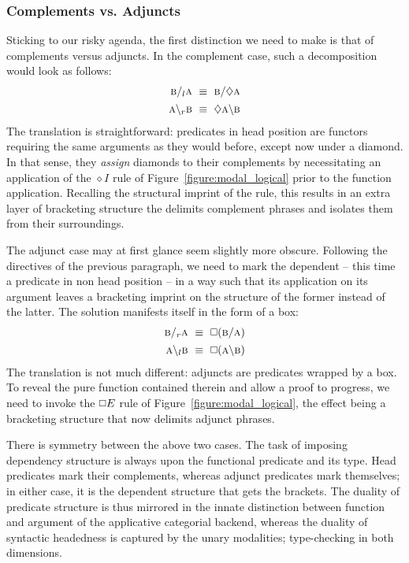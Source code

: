 \subsubsection{Complements vs. Adjuncts}
Sticking to our risky agenda, the first distinction we need to make is that of complements versus adjuncts.
In the complement case, such a decomposition would look as follows:
\begin{align}
	\prop{b} \divright_l \prop{a} \ \equiv \ \prop{b} \divright \diamond \prop{a} \\
	\prop{a} \divleft_r \prop{b} \ \equiv \ \diamond  \prop{a} \divleft \prop{b}
\end{align}
The translation is straightforward: predicates in head position are functors requiring the same arguments as they would before, except now under a diamond.
In that sense, they \textit{assign} diamonds to their complements by necessitating an application of the $\diamond I$ rule of Figure~\ref{figure:modal_logical} prior to the function application.
Recalling the structural imprint of the rule, this results in an extra layer of bracketing structure the delimits complement phrases and isolates them from their surroundings.

The adjunct case may at first glance seem slightly more obscure.
Following the directives of the previous paragraph, we need to mark the dependent -- this time a predicate in non head position -- in a way such that its application on its argument leaves a bracketing imprint on the structure of the former instead of the latter.
The solution manifests itself in the form of a box:
\begin{align}
	\prop{b} \divright_r \prop{a} \ \equiv \ \bx (\prop{b} \divright \prop{a}) \\
	\prop{a} \divleft_l \prop{b} \ \equiv \ \bx (\prop{a} \divleft \prop{b})
\end{align}
The translation is not much different: adjuncts are predicates wrapped by a box.
To reveal the pure function contained therein and allow a proof to progress, we need to invoke the $\bx E$ rule of Figure~\ref{figure:modal_logical}, the effect being a bracketing structure that now delimits adjunct phrases.

There is symmetry between the above two cases.
The task of imposing dependency structure is always upon the functional predicate and its type.
Head predicates mark their complements, whereas adjunct predicates mark themselves; in either case, it is the dependent structure that gets the brackets.
The duality of predicate structure is thus mirrored in the innate distinction between function and argument of the applicative categorial backend, whereas the duality of syntactic headedness is captured by the unary modalities; type-checking in both dimensions.

